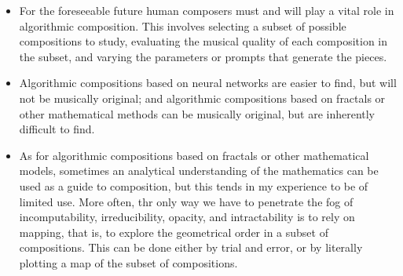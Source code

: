 \documentclass[11pt]{amsart}
\begin{document}
\begin{itemize}
\item For the foreseeable future human composers must and will play a vital role in algorithmic composition. This involves selecting a subset of possible compositions to study, evaluating the musical quality of each composition in the subset, and varying the parameters or prompts that generate the pieces.
\item Algorithmic compositions based on neural networks are easier to find, but will not be musically original; and algorithmic compositions based on fractals or other mathematical methods can be musically original, but are inherently difficult to find.
\item As for algorithmic compositions based on fractals or other mathematical models, sometimes an analytical understanding of the mathematics can be used as a guide to composition, but this tends in my experience to be of limited use. More often, thr only way we have to penetrate the fog of incomputability, irreducibility, opacity, and intractability is to rely on mapping, that is, to explore the geometrical order in a subset of compositions. This can be done either by trial and error, or by literally plotting a map of the subset of compositions.
\end{itemize}















%
\printbibliography
\end{document}

